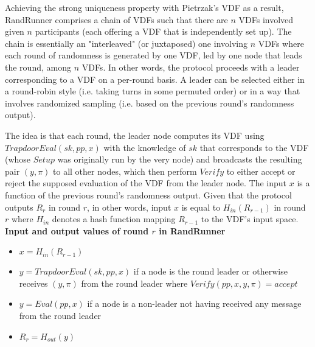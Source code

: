 \documentclass[letterpaper,twocolumn,10pt]{article}
\theoremstyle{definition}
\theoremstyle{remark}
\begin{document}
Achieving the strong uniqueness property with Pietrzak's VDF as a result, RandRunner comprises a chain of VDFs such that there are $n$ VDFs involved given $n$ participants (each offering a VDF that is independently set up). The chain is essentially an "interleaved" (or juxtaposed) one involving $n$ VDFs where each round of randomness is generated by one VDF, led by one node that leads the round, among $n$ VDFs. In other words, the protocol proceeds with a leader corresponding to a VDF on a per-round basis. A leader can be selected either in a round-robin style (i.e. taking turns in some permuted order) or in a way that involves randomized sampling (i.e. based on the previous round's randomness output).

The idea is that each round, the leader node computes its VDF using $TrapdoorEval(sk, pp, x)$ with the knowledge of $sk$ that corresponds to the VDF (whose $Setup$ was originally run by the very node) and broadcasts the resulting pair $(y, \pi)$ to all other nodes, which then perform $Verify$ to either accept or reject the supposed evaluation of the VDF from the leader node. The input $x$ is a function of the previous round's randomness output. Given that the protocol outputs $R_r$ in round $r$, in other words, input $x$ is equal to $H_{in}(R_{r - 1})$ in round $r$ where $H_{in}$ denotes a hash function mapping $R_{r - 1}$ to the VDF's input space.\\

\textbf{Input and output values of round $r$ in RandRunner}
\begin{itemize}
\item $x = H_{in}(R_{r - 1})$
\item $y = TrapdoorEval(sk, pp, x)$ if a node is the round leader or otherwise receives $(y, \pi)$ from the round leader where $Verify(pp, x, y, \pi) = accept$
\item $y = Eval(pp, x)$ if a node is a non-leader not having received any message from the round leader
\item $R_r = H_{out}(y)$
\end{itemize}
\end{document}
